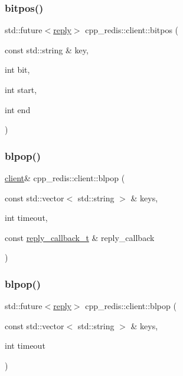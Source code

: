 \subsubsection{\texorpdfstring{bitpos()}{bitpos()}\hspace{0.1cm}{\footnotesize\ttfamily [6/6]}}
{\footnotesize\ttfamily std\+::future$<$\hyperlink{classcpp__redis_1_1reply}{reply}$>$ cpp\+\_\+redis\+::client\+::bitpos (\begin{DoxyParamCaption}\item[{const std\+::string \&}]{key,  }\item[{int}]{bit,  }\item[{int}]{start,  }\item[{int}]{end }\end{DoxyParamCaption})}

\mbox{\label{classcpp__redis_1_1client_a432c2677b13dc8e2a9d7afe7eade39e3}} 
\subsubsection{\texorpdfstring{blpop()}{blpop()}\hspace{0.1cm}{\footnotesize\ttfamily [1/2]}}
{\footnotesize\ttfamily \hyperlink{classcpp__redis_1_1client}{client}\& cpp\+\_\+redis\+::client\+::blpop (\begin{DoxyParamCaption}\item[{const std\+::vector$<$ std\+::string $>$ \&}]{keys,  }\item[{int}]{timeout,  }\item[{const \hyperlink{classcpp__redis_1_1client_a061a1140d36d2eaeda82b09a0bb3f9f2}{reply\+\_\+callback\+\_\+t} \&}]{reply\+\_\+callback }\end{DoxyParamCaption})}

\mbox{\label{classcpp__redis_1_1client_ac54c987bca4efb4bf6659b063f19d5ff}} 
\subsubsection{\texorpdfstring{blpop()}{blpop()}\hspace{0.1cm}{\footnotesize\ttfamily [2/2]}}
{\footnotesize\ttfamily std\+::future$<$\hyperlink{classcpp__redis_1_1reply}{reply}$>$ cpp\+\_\+redis\+::client\+::blpop (\begin{DoxyParamCaption}\item[{const std\+::vector$<$ std\+::string $>$ \&}]{keys,  }\item[{int}]{timeout }\end{DoxyParamCaption})}

